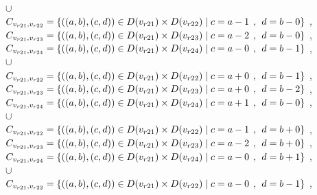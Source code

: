 \\$\cup$
\\$C_{v_{r21},v_{r22}}=\{((a,b),(c,d))\in D(v_{r21}) \times D(v_{r22})\mid c = a - 1\hspace{1ex} , \hspace{1ex}  d = b - 0 \}$ , 
\\$C_{v_{r21},v_{r23}}=\{((a,b),(c,d))\in D(v_{r21}) \times D(v_{r23})\mid c = a - 2\hspace{1ex} , \hspace{1ex}  d = b - 0 \}$ , 
\\$C_{v_{r21},v_{r24}}=\{((a,b),(c,d))\in D(v_{r21}) \times D(v_{r24})\mid c = a - 0\hspace{1ex} , \hspace{1ex}  d = b - 1 \}$ , 
\\$\cup$
\\$C_{v_{r21},v_{r22}}=\{((a,b),(c,d))\in D(v_{r21}) \times D(v_{r22})\mid c = a + 0\hspace{1ex} , \hspace{1ex}  d = b - 1 \}$ , 
\\$C_{v_{r21},v_{r23}}=\{((a,b),(c,d))\in D(v_{r21}) \times D(v_{r23})\mid c = a + 0\hspace{1ex} , \hspace{1ex}  d = b - 2 \}$ , 
\\$C_{v_{r21},v_{r24}}=\{((a,b),(c,d))\in D(v_{r21}) \times D(v_{r24})\mid c = a + 1\hspace{1ex} , \hspace{1ex}  d = b - 0 \}$ , 
\\$\cup$
\\$C_{v_{r21},v_{r22}}=\{((a,b),(c,d))\in D(v_{r21}) \times D(v_{r22})\mid c = a - 1\hspace{1ex} , \hspace{1ex}  d = b + 0 \}$ , 
\\$C_{v_{r21},v_{r23}}=\{((a,b),(c,d))\in D(v_{r21}) \times D(v_{r23})\mid c = a - 2\hspace{1ex} , \hspace{1ex}  d = b + 0 \}$ , 
\\$C_{v_{r21},v_{r24}}=\{((a,b),(c,d))\in D(v_{r21}) \times D(v_{r24})\mid c = a - 0\hspace{1ex} , \hspace{1ex}  d = b + 1 \}$ , 
\\$\cup$
\\$C_{v_{r21},v_{r22}}=\{((a,b),(c,d))\in D(v_{r21}) \times D(v_{r22})\mid c = a - 0\hspace{1ex} , \hspace{1ex}  d = b - 1 \}$ , 
